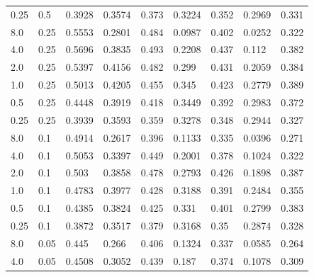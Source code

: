 \begin{figure}
\begin{tabular}{llp{1.2cm}p{1.2cm}p{1.2cm}p{1.2cm}p{1.2cm}p{1.2cm}p{1.2cm}}
              0.25 &       0.5 &   0.3928 &          0.3574 &      0.373 &          0.3224 &      0.352 &           0.2969 &       0.331 \\
               8.0 &      0.25 &   0.5553 &          0.2801 &      0.484 &          0.0987 &      0.402 &           0.0252 &       0.322 \\
               4.0 &      0.25 &   0.5696 &          0.3835 &      0.493 &          0.2208 &      0.437 &            0.112 &       0.382 \\
               2.0 &      0.25 &   0.5397 &          0.4156 &      0.482 &           0.299 &      0.431 &           0.2059 &       0.384 \\
               1.0 &      0.25 &   0.5013 &          0.4205 &      0.455 &           0.345 &      0.423 &           0.2779 &       0.389 \\
               0.5 &      0.25 &   0.4448 &          0.3919 &      0.418 &          0.3449 &      0.392 &           0.2983 &       0.372 \\
              0.25 &      0.25 &   0.3939 &          0.3593 &      0.359 &          0.3278 &      0.348 &           0.2944 &       0.327 \\
               8.0 &       0.1 &   0.4914 &          0.2617 &      0.396 &          0.1133 &      0.335 &           0.0396 &       0.271 \\
               4.0 &       0.1 &   0.5053 &          0.3397 &      0.449 &          0.2001 &      0.378 &           0.1024 &       0.322 \\
               2.0 &       0.1 &    0.503 &          0.3858 &      0.478 &          0.2793 &      0.426 &           0.1898 &       0.387 \\
               1.0 &       0.1 &   0.4783 &          0.3977 &      0.428 &          0.3188 &      0.391 &           0.2484 &       0.355 \\
               0.5 &       0.1 &   0.4385 &          0.3824 &      0.425 &           0.331 &      0.401 &           0.2799 &       0.383 \\
              0.25 &       0.1 &   0.3872 &          0.3517 &      0.379 &          0.3168 &       0.35 &           0.2874 &       0.328 \\
               8.0 &      0.05 &    0.445 &           0.266 &      0.406 &          0.1324 &      0.337 &           0.0585 &       0.264 \\
               4.0 &      0.05 &   0.4508 &          0.3052 &      0.439 &           0.187 &      0.374 &           0.1078 &       0.309 \\

\end{tabular}
\end{figure}
